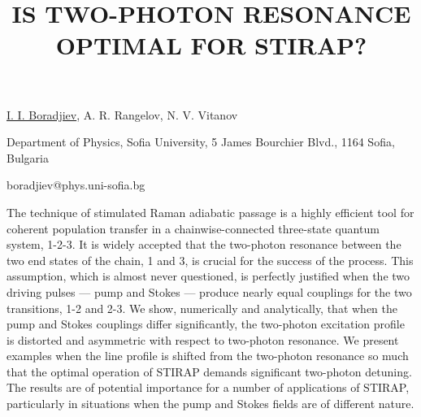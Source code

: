 \title{IS TWO-PHOTON RESONANCE OPTIMAL FOR STIRAP?}

\underline{I. I. Boradjiev}, A. R. Rangelov, N. V. Vitanov
  

{\normalsize{\vspace{-4mm}
Department of Physics, Sofia University, 5 James Bourchier Blvd.,
1164 Sofia, Bulgaria

\email boradjiev@phys.uni-sofia.bg}}

The technique of stimulated Raman adiabatic passage is a highly efficient tool for coherent population transfer in a chainwise-connected three-state quantum system, 1-2-3.
It is widely accepted that the two-photon resonance between the two end states of the chain, 1 and 3, is crucial for the success of the process.
This assumption, which is almost never questioned, is perfectly justified when the two driving pulses --- pump and Stokes --- produce nearly equal couplings for the two transitions, 1-2 and 2-3.
We show, numerically and analytically, that when the pump and Stokes couplings differ significantly, the two-photon excitation profile is distorted and asymmetric with respect to two-photon resonance.
We present examples when the line profile is shifted from the two-photon resonance so much that the optimal operation of STIRAP demands significant two-photon detuning.
The results are of potential importance for a number of applications of STIRAP, particularly in situations when the pump and Stokes fields are of different nature.

\vspace{\baselineskip}